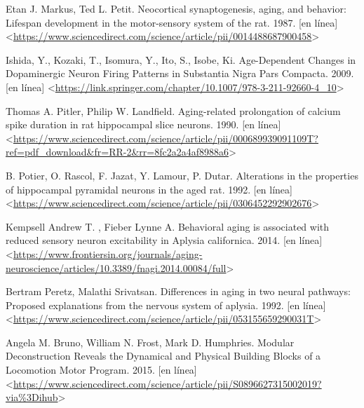 

\begin{references}


    Etan J. Markus, Ted L. Petit. Neocortical synaptogenesis, aging, and behavior: Lifespan development in the motor-sensory system of the rat. 1987. [en línea] <\url{https://www.sciencedirect.com/science/article/pii/0014488687900458}>

   Ishida, Y., Kozaki, T., Isomura, Y., Ito, S., Isobe, Ki. Age-Dependent Changes in Dopaminergic Neuron Firing Patterns in Substantia Nigra Pars Compacta. 2009. [en línea] <\url{https://link.springer.com/chapter/10.1007/978-3-211-92660-4_10}>

    Thomas A. Pitler, Philip W. Landfield. Aging-related prolongation of calcium spike duration in rat hippocampal slice neurons. 1990. [en línea]<\url{https://www.sciencedirect.com/science/article/pii/000689939091109T?ref=pdf_download&fr=RR-2&rr=8fc2a2a4af8988a6}>
    
    B. Potier, O. Rascol, F. Jazat, Y. Lamour, P. Dutar. Alterations in the properties of hippocampal pyramidal neurons in the aged rat. 1992. [en línea] <\url{https://www.sciencedirect.com/science/article/pii/0306452292902676}>
    
    Kempsell Andrew T. , Fieber Lynne A. Behavioral aging is associated with reduced sensory neuron excitability in Aplysia californica. 2014. [en línea] <\url{https://www.frontiersin.org/journals/aging-neuroscience/articles/10.3389/fnagi.2014.00084/full}>

    Bertram Peretz, Malathi Srivatsan. Differences in aging in two neural pathways: Proposed explanations from the nervous system of aplysia. 1992. [en línea] <\url{https://www.sciencedirect.com/science/article/pii/053155659290031T}>
    
    Angela M. Bruno, William N. Frost, Mark D. Humphries. Modular Deconstruction Reveals the Dynamical and Physical Building Blocks of a Locomotion Motor Program. 2015. [en línea] <\url{https://www.sciencedirect.com/science/article/pii/S0896627315002019?via%3Dihub}>

\end{references}
